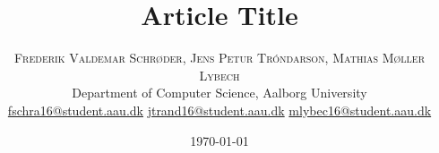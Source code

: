 %
%
%
%




\setlength{\droptitle}{-4\baselineskip} %

\pretitle{\begin{center}\Huge\bfseries} %
\posttitle{\end{center}} %
\title{Article Title} %
\author{%
\textsc{Frederik Valdemar Schrøder, Jens Petur Tróndarson, Mathias Møller Lybech} \\[1ex] %
\normalsize Department of Computer Science, Aalborg University \\ %
\normalsize \href{mailto:fschra16@student.aau.dk}{fschra16@student.aau.dk} %
\normalsize \href{mailto:jtrand16@student.aau.dk}{jtrand16@student.aau.dk} %
\normalsize \href{mailto:mlybec16@student.aau.dk}{mlybec16@student.aau.dk} %
}
\date{\today} %
\renewcommand{\maketitlehookd}{%
\begin{abstract}
\noindent \blindtext %
\end{abstract}
}




\maketitle

